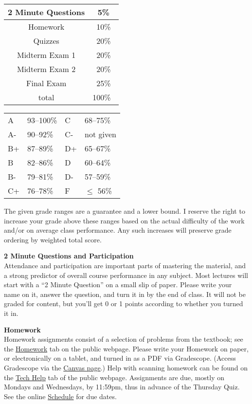 \documentclass[12pt]{article}
\renewcommand{\emph}[1]{\textsf{\textbf{#1}}}
\newcommand{\localhead}[1]{\par\smallskip\textbf{#1} \smallskip\nobreak\\}%
\def\heading#1{\localhead{\large\emph{#1}}}
\begin{document}
\begin{multicols}{2}
\begin{tabular}{|c|c|}
\hline
2 Minute Questions & 5\%\\
\hline
Homework & 10\% \\
\hline
Quizzes & 20\% \\
\hline
Midterm Exam 1 & 20\% \\
\hline
Midterm Exam 2 & 20\%  \\
\hline
Final Exam & 25\% \\
\hline
total & 100\% \, \\
\hline
\end{tabular}

\begin{tabular}{llll}
A  & 93--100\%& C  & 68--75\%  \\
A- & 90--92\% & C- & not given \\
B+ & 87--89\% & D+ & 65--67\%  \\
B  & 82--86\% & D  & 60--64\%  \\
B- & 79--81\% & D- & 57--59\%  \\
C+ & 76--78\% & F  & $\le$ 56\%
\end{tabular}
\end{multicols}

The given grade ranges are a guarantee and a lower bound.  I reserve the right to increase your grade above these ranges based on the actual difficulty of the work and/or on average class performance.  Any such increases will preserve grade ordering by weighted total score. 


\heading{2 Minute Questions and Participation}
Attendance and participation are important parts of mastering the material, and a strong predictor of overall course performance in any subject.  Most lectures will start with a ``2 Minute Question'' on a small slip of paper.  Please write your name on it, answer the question, and turn it in by the end of class.  It will not be graded for content, but you'll get 0 or 1 points according to whether you turned it in.


\heading{Homework}
Homework assignments consist of a selection of problems from the textbook; see the \href{https://bueler.github.io/calc3/homework.html}{Homework} tab on the public webpage.  Please write your Homework on paper, or electronically on a tablet, and turned in as a PDF via Gradescope.  (Access Gradescope via the \href{https://canvas.alaska.edu/courses/13188}{Canvas page}.)  Help with scanning homework can be found on the \href{https://bueler.github.io/calc3/techHelp.html}{Tech Help} tab of the public webpage.  Assignments are due, mostly on Mondays and Wednesdays, by 11:59pm, thus in advance of the Thursday Quiz.  See the online \href{https://bueler.github.io/calc3/assets/general/schedule.pdf}{Schedule} for due dates.
\end{document}
